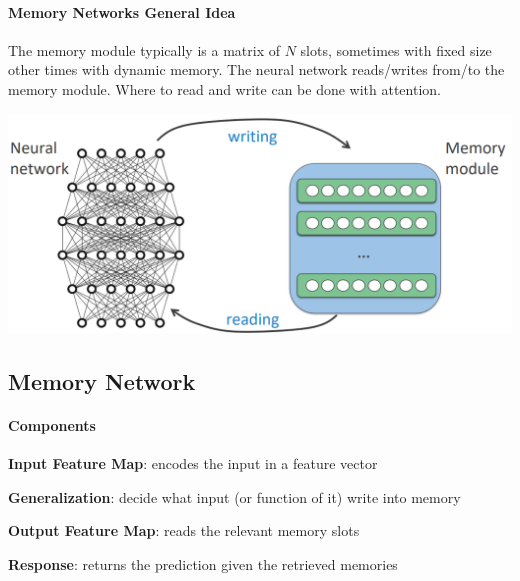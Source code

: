 \documentclass[10pt]{report}
\begin{document}
\paragraph{Memory Networks General Idea} 
The memory module typically is a matrix of $N$ slots, sometimes with fixed size other times with dynamic memory. The neural network reads/writes from/to the memory module. Where to read and write can be done with attention.
\begin{center}
	\includegraphics[scale=0.5]{127.png}
\end{center}
\subsection{Memory Network}
\paragraph{Components}\begin{list}{}{}
	\item \textbf{Input Feature Map}: encodes the input in a feature vector
	\item \textbf{Generalization}: decide what input (or function of it) write into memory
	\item \textbf{Output Feature Map}: reads the relevant memory slots
	\item \textbf{Response}: returns the prediction given the retrieved memories
\end{list}
\end{document}
